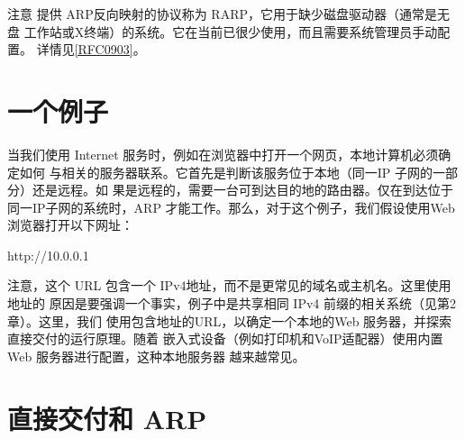 注意 提供 ARP反向映射的协议称为 RARP，它用于缺少磁盘驱动器（通常是无盘
工作站或X终端）的系统。它在当前已很少使用，而且需要系统管理员手动配置。
详情见\href{https://www.rfc-editor.org/rfc/rfc0903}{[RFC0903]}。

\section{一个例子}

当我们使用 Internet 服务时，例如在浏览器中打开一个网页，本地计算机必须确定如何
与相关的服务器联系。它首先是判断该服务位于本地（同一IP 子网的一部分）还是远程。如
果是远程的，需要一台可到达目的地的路由器。仅在到达位于同一IP子网的系统时，ARP
才能工作。那么，对于这个例子，我们假设使用Web 浏览器打开以下网址：

http://10.0.0.1

注意，这个 URL 包含一个 IPv4地址，而不是更常见的域名或主机名。这里使用地址的
原因是要强调一个事实，例子中是共享相同 IPv4 前缀的相关系统（见第2章）。这里，我们
使用包含地址的URL，以确定一个本地的Web 服务器，并探索直接交付的运行原理。随着
嵌入式设备（例如打印机和VoIP适配器）使用内置Web 服务器进行配置，这种本地服务器
越来越常见。

\section{直接交付和 ARP}

